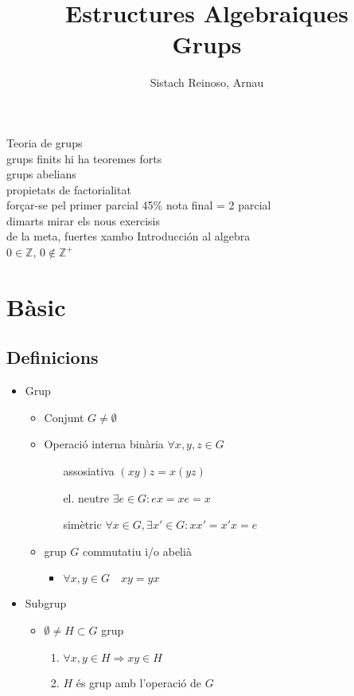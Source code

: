 \documentclass{article}
\title{Estructures Algebraiques\\Grups}
\author{Sistach Reinoso, Arnau}
\newcommand{\Z}{\mathbb{Z}}
\begin{document}
\maketitle
Teoria de grups\\
grups finits hi ha teoremes forts\\
grups abelians\\
propietats de factorialitat\\
forçar-se pel primer parcial 45\% nota final = 2 parcial\\
dimarts mirar els nous exercisis\\
de la meta, fuertes xambo Introducción al algebra\\
$0 \in \Z$,
$0 \notin {\mathbb Z}^+$
\newpage
\tableofcontents
\newpage

\section{Bàsic}
\subsection{Definicions}
\begin{itemize}
\item Grup
	\begin{itemize}
	\item Conjunt $G \neq \emptyset$
	\item Operació interna binària $\forall x, y, z \in G$
		\begin{enumerate}
		\item[assosiativa] $(xy)z = x(yz) $
		\item[el. neutre] $\exists e \in G: ex = xe = x$
		\item[simètric] $\forall x \in G, \exists x' \in G: xx' = x'x = e$
		\end{enumerate}
	\item grup $G$ commutatiu i/o abelià
		\begin{itemize}
		\item $\forall x, y \in G\quad xy = yx$
		\end{itemize}
	\end{itemize}
\item Subgrup
	\begin{itemize}
	\item $\emptyset \neq H \subset G$ grup
		\begin{enumerate}
		\item $\forall x, y \in H \Rightarrow xy \in H$
		\item $H$ és grup amb l'operació de $G$
		\end{enumerate}
	\end{itemize}
\end{itemize}
\end{document}
